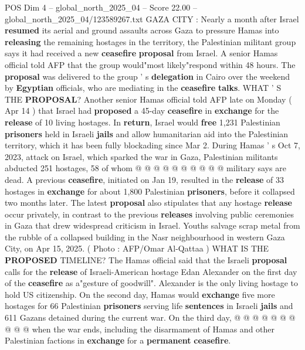 \begin{textsample}{POS Dim 4 – global\_north\_2025\_04 – Score 22.00 – global\_north\_2025\_04/123589267.txt}  \label{ex:f4_pos_220}
GAZA CITY : Nearly a month after Israel \textbf{resumed} its aerial and ground assaults across Gaza to pressure Hamas into \textbf{releasing} the remaining hostages in the territory, the Palestinian militant group says it had received a new \textbf{ceasefire} \textbf{proposal} from Israel.
A senior Hamas official told AFP that the group would"most likely"respond within 48 hours.
The \textbf{proposal} was delivered to the group ' s \textbf{delegation} in Cairo over the weekend by \textbf{Egyptian} officials, who are mediating in the \textbf{ceasefire} \textbf{talks}.
WHAT ' S THE \textbf{PROPOSAL}?
Another senior Hamas official told AFP late on Monday ( Apr 14 ) that Israel had \textbf{proposed} a 45-day \textbf{ceasefire} in \textbf{exchange} for the \textbf{release} of 10 living hostages.
In \textbf{return}, Israel would \textbf{free} 1,231 Palestinian \textbf{prisoners} held in Israeli \textbf{jails} and allow humanitarian aid into the Palestinian territory, which it has been fully blockading since Mar 2.
During Hamas ' s Oct 7, 2023, attack on Israel, which sparked the war in Gaza, Palestinian militants abducted 251 hostages, 58 of whom @ @ @ @ @ @ @ @ @ @ military says are dead.
A previous \textbf{ceasefire}, initiated on Jan 19, resulted in the \textbf{release} of 33 hostages in \textbf{exchange} for about 1,800 Palestinian \textbf{prisoners}, before it collapsed two months later.
The latest \textbf{proposal} also stipulates that any hostage \textbf{release} occur privately, in contrast to the previous \textbf{releases} involving public ceremonies in Gaza that drew widespread criticism in Israel.
Youths salvage scrap metal from the rubble of a collapsed building in the Nasr neighbourhood in western Gaza City, on Apr 15, 2025. ( Photo : AFP/Omar Al-Qattaa ) WHAT IS THE \textbf{PROPOSED} TIMELINE?
The Hamas official said that the Israeli \textbf{proposal} calls for the \textbf{release} of Israeli-American hostage Edan Alexander on the first day of the \textbf{ceasefire} as a"gesture of goodwill".
Alexander is the only living hostage to hold US citizenship.
On the second day, Hamas would \textbf{exchange} five more hostages for 66 Palestinian \textbf{prisoners} serving life \textbf{sentences} in Israeli \textbf{jails} and 611 Gazans detained during the current war.
On the third day, @ @ @ @ @ @ @ @ @ @ when the war ends, including the disarmament of Hamas and other Palestinian factions in \textbf{exchange} for a \textbf{permanent} \textbf{ceasefire}.

\end{textsample}
